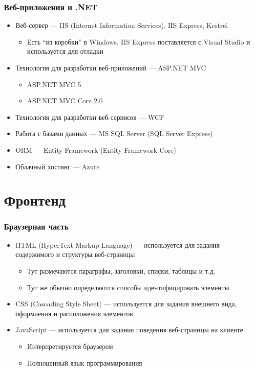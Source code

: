 \documentclass[xetex,mathserif,serif]{beamer}
\begin{document}
	\begin{frame}
		\frametitle{Веб-приложения и .NET}
		\begin{itemize}
			\item Веб-сервер --- IIS (Internet Information Services), IIS Express, Kestrel
			\begin{itemize}
				\item Есть ``из коробки'' в Windows, IIS Express поставляется с Visual Studio и используется для отладки
			\end{itemize}
			\item Технология для разработки веб-приложений --- ASP.NET MVC
			\begin{itemize}
				\item ASP.NET MVC 5
				\item ASP.NET MVC Core 2.0
			\end{itemize}
			\item Технология для разработки веб-сервисов --- WCF
			\item Работа с базами данных --- MS SQL Server (SQL Server Express)
			\item ORM --- Entity Framework (Entity Framework Core)
			\item Облачный хостинг --- Azure
		\end{itemize}
	\end{frame}

	\section{Фронтенд}

	\begin{frame}
		\frametitle{Браузерная часть}
		\begin{itemize}
			\item HTML (HyperText Markup Language) --- используется для задания содержимого и структуры веб-страницы
			\begin{itemize}
				\item Тут размечаются параграфы, заголовки, списки, таблицы и т.д.
				\item Тут же обычно определяются способы идентифицировать элементы
			\end{itemize}
			\item CSS (Cascading Style Sheet) --- используется для задания внешнего вида, оформления и расположения элементов
			\item JavaScript --- используется для задания поведения веб-страницы на клиенте
			\begin{itemize}
				\item Интерпретируется браузером
				\item Полноценный язык программирования
			\end{itemize}
		\end{itemize}
	\end{frame}
\end{document}
